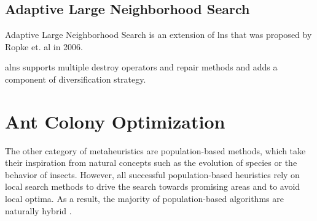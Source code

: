 \subsection{Adaptive Large Neighborhood Search}
Adaptive Large Neighborhood Search is an extension of \gls{lns} that was proposed by Ropke et. al \cite{alns} in 2006.

\gls{alns} supports multiple destroy operators and repair methods and adds a component of diversification strategy.


\section{Ant Colony Optimization}
The other category of metaheuristics are population-based methods, which take their inspiration from natural concepts such as the evolution of species or the behavior of insects. However, all successful population-based heuristics rely on local search methods to drive the search towards promising areas and to avoid local optima. As a result, the majority of population-based algorithms are naturally hybrid \cite{vrp-bible}.

